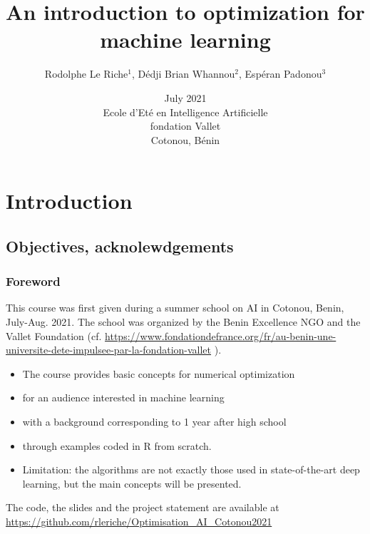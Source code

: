 \documentclass[12pt]{beamer}
\begin{document}
\title
[~Optimization for machine learning
]
{An introduction to optimization for machine learning}
\author
[Le Riche et al.]
{\large Rodolphe Le Riche$^1$, Dédji Brian Whannou$^2$, Espéran Padonou$^3$} 
\date[July 2021]{July 2021 \\
Ecole d'Eté en Intelligence Artificielle \\
fondation Vallet\\
Cotonou, Bénin} 
\begin{frame}
\titlepage
\end{frame}

\section{Introduction}
\subsection{Objectives, acknolewdgements}

\begin{frame}
\frametitle{Foreword}
This course was first given during a summer school on AI in Cotonou, Benin, July-Aug. 2021.
The school was organized by the Benin Excellence NGO and the Vallet Foundation (cf. 
{\scriptsize
\url{https://www.fondationdefrance.org/fr/au-benin-une-universite-dete-impulsee-par-la-fondation-vallet}}
).
\begin{itemize}
\item The course provides basic concepts for numerical optimization
\item for an audience interested in machine learning
\item with a background corresponding to 1 year after high school
\item through examples coded in R from scratch.
\item Limitation: the algorithms are not exactly those used in state-of-the-art deep learning, but the main concepts will be presented.
\end{itemize}
The code, the slides and the project statement are available at \url{https://github.com/rleriche/Optimisation_AI_Cotonou2021}
\end{frame}
\end{document}
